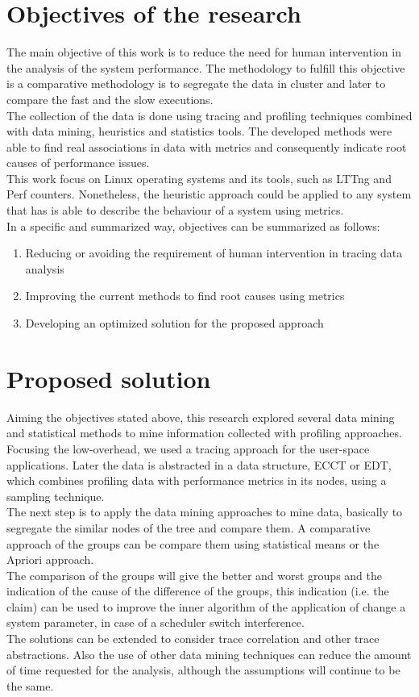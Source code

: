\section{Objectives of the research}  %
The main objective of this work is to reduce the need for human intervention in the analysis of the system performance. The methodology to fulfill this objective is a comparative methodology is to segregate the data in cluster and later to compare the fast and the slow executions.\\
The collection of the data is done using tracing and profiling techniques combined with data mining, heuristics and statistics tools. The developed methods were able to find real associations in data with metrics and consequently indicate root causes of performance issues.\\
This work focus on Linux operating systems and its tools, such as LTTng and Perf counters. Nonetheless, the heuristic approach could be applied to any system that has is able to describe the behaviour of a system using metrics.\\
In a specific and summarized way, objectives can be summarized as follows:\\
\begin{enumerate}
\item Reducing or avoiding the requirement of human intervention in tracing data analysis
\item Improving the current methods to find root causes using metrics
\item Developing an optimized solution for the proposed approach
\end{enumerate}
\section{Proposed solution}  %
Aiming the objectives stated above, this research explored several data mining and statistical methods to mine information collected with profiling approaches. Focusing the low-overhead, we used a tracing approach for the user-space applications. Later the data is abstracted in a data structure, ECCT or EDT, which combines profiling data with performance metrics in its nodes, using a sampling technique.\\
The next step is to apply the data mining approaches to mine data, basically to segregate the similar nodes of the tree and compare them. A comparative approach of the groups can be compare them using statistical means or the Apriori approach.\\
The comparison of the groups will give the better and worst groups and the indication of the cause of the difference of the groups, this indication (i.e. the claim) can be used to improve the inner algorithm of the application of change a system parameter, in case of a scheduler switch interference.\\
The solutions can be extended to consider trace correlation and other trace abstractions. Also the use of other data mining techniques can reduce the amount of time requested for the analysis, although the assumptions will continue to be the same.

